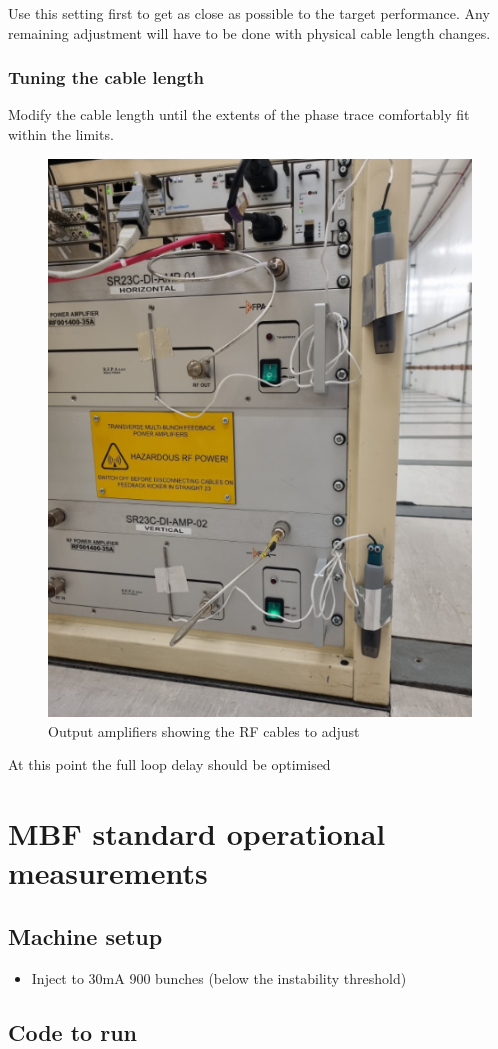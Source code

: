 \documentclass{report}
\begin{document}
Use this setting first to get as close as possible to the target performance. Any remaining adjustment will have to be done with physical cable length changes. 
\clearpage
\subsubsection{Tuning the cable length} 
Modify the cable length until the extents of the phase trace comfortably fit within the limits.  
\begin{figure}[ht]
    \centering
    \includegraphics[width=0.6\linewidth]{amp_front.png}
    \caption{Output amplifiers showing the RF cables to adjust}
    \label{fig:output_amplifiers}
\end{figure}
At this point the full loop delay should be optimised
\clearpage

\section{MBF standard operational measurements}
\subsection{Machine setup} 
\begin{itemize}
    \item {Inject to 30mA 900 bunches (below the instability threshold)}
\end{itemize}

\subsection{Code to run}
\end{document}

